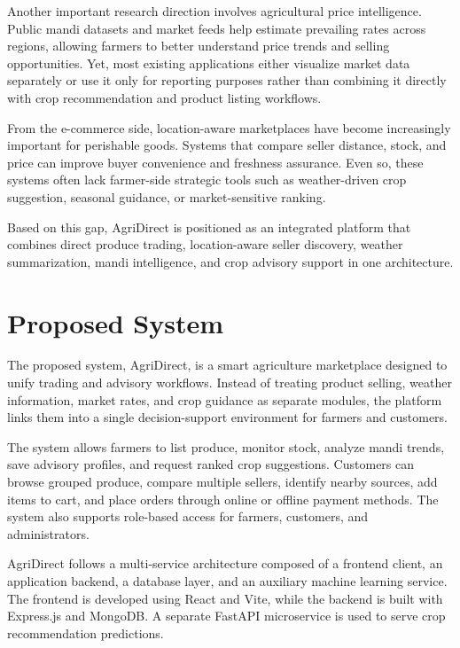 \documentclass[conference]{IEEEtran}
\begin{document}
Another important research direction involves agricultural price intelligence. Public mandi datasets and market feeds help estimate prevailing rates across regions, allowing farmers to better understand price trends and selling opportunities. Yet, most existing applications either visualize market data separately or use it only for reporting purposes rather than combining it directly with crop recommendation and product listing workflows.

From the e-commerce side, location-aware marketplaces have become increasingly important for perishable goods. Systems that compare seller distance, stock, and price can improve buyer convenience and freshness assurance. Even so, these systems often lack farmer-side strategic tools such as weather-driven crop suggestion, seasonal guidance, or market-sensitive ranking.

Based on this gap, AgriDirect is positioned as an integrated platform that combines direct produce trading, location-aware seller discovery, weather summarization, mandi intelligence, and crop advisory support in one architecture.

\section{Proposed System}
The proposed system, AgriDirect, is a smart agriculture marketplace designed to unify trading and advisory workflows. Instead of treating product selling, weather information, market rates, and crop guidance as separate modules, the platform links them into a single decision-support environment for farmers and customers.

The system allows farmers to list produce, monitor stock, analyze mandi trends, save advisory profiles, and request ranked crop suggestions. Customers can browse grouped produce, compare multiple sellers, identify nearby sources, add items to cart, and place orders through online or offline payment methods. The system also supports role-based access for farmers, customers, and administrators.

AgriDirect follows a multi-service architecture composed of a frontend client, an application backend, a database layer, and an auxiliary machine learning service. The frontend is developed using React and Vite, while the backend is built with Express.js and MongoDB. A separate FastAPI microservice is used to serve crop recommendation predictions.
\end{document}
